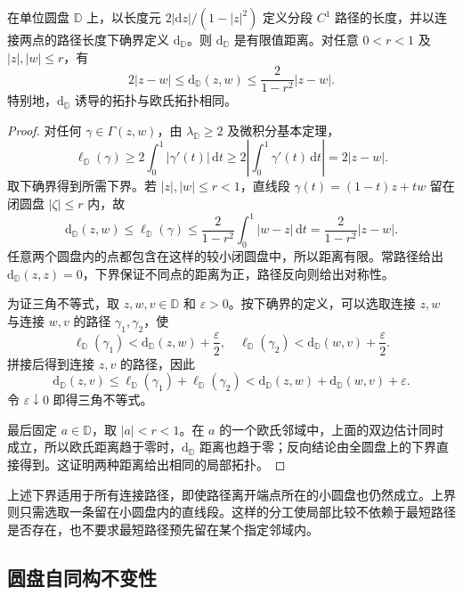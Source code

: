\begin{proposition}[路径距离与局部拓扑]\label{b3:prop:13-disk-path-metric}
在单位圆盘 \(\mathbb D\) 上，以长度元 \(2|\mathrm dz|/(1-|z|^2)\) 定义分段 \(C^1\) 路径的长度，并以连接两点的路径长度下确界定义 \(\mathrm d_{\mathbb D}\)。则 \(\mathrm d_{\mathbb D}\) 是有限值距离。对任意 \(0<r<1\) 及 \(|z|,|w|\le r\)，有
\[
 2|z-w|\le\mathrm d_{\mathbb D}(z,w)
 \le\frac{2}{1-r^2}|z-w|.
\]
特别地，\(\mathrm d_{\mathbb D}\) 诱导的拓扑与欧氏拓扑相同。
\end{proposition}
\begin{proof}
对任何 \(\gamma\in\Gamma(z,w)\)，由 \(\lambda_{\mathbb D}\ge2\) 及微积分基本定理，
\[
 \ell_{\mathbb D}(\gamma)
 \ge2\int_0^1|\gamma'(t)|\,\mathrm dt
 \ge2\left|\int_0^1\gamma'(t)\,\mathrm dt\right|
 =2|z-w|.
\]
取下确界得到所需下界。若 \(|z|,|w|\le r<1\)，直线段 \(\gamma(t)=(1-t)z+tw\) 留在闭圆盘 \(|\zeta|\le r\) 内，故
\[
 \mathrm d_{\mathbb D}(z,w)
 \le\ell_{\mathbb D}(\gamma)
 \le\frac{2}{1-r^2}\int_0^1|w-z|\,\mathrm dt
 =\frac{2}{1-r^2}|z-w|.
\]
任意两个圆盘内的点都包含在这样的较小闭圆盘中，所以距离有限。常路径给出 \(\mathrm d_{\mathbb D}(z,z)=0\)，下界保证不同点的距离为正，路径反向则给出对称性。

为证三角不等式，取 \(z,w,v\in\mathbb D\) 和 \(\varepsilon>0\)。按下确界的定义，可以选取连接 \(z,w\) 与连接 \(w,v\) 的路径 \(\gamma_1,\gamma_2\)，使
\[
 \ell_{\mathbb D}(\gamma_1)<\mathrm d_{\mathbb D}(z,w)+\frac\varepsilon2,
 \quad
 \ell_{\mathbb D}(\gamma_2)<\mathrm d_{\mathbb D}(w,v)+\frac\varepsilon2.
\]
拼接后得到连接 \(z,v\) 的路径，因此
\[
 \mathrm d_{\mathbb D}(z,v)
 \le\ell_{\mathbb D}(\gamma_1)+\ell_{\mathbb D}(\gamma_2)
 <\mathrm d_{\mathbb D}(z,w)+\mathrm d_{\mathbb D}(w,v)+\varepsilon.
\]
令 \(\varepsilon\downarrow0\) 即得三角不等式。

最后固定 \(a\in\mathbb D\)，取 \(|a|<r<1\)。在 \(a\) 的一个欧氏邻域中，上面的双边估计同时成立，所以欧氏距离趋于零时，\(\mathrm d_{\mathbb D}\) 距离也趋于零；反向结论由全圆盘上的下界直接得到。这证明两种距离给出相同的局部拓扑。
\end{proof}

上述下界适用于所有连接路径，即使路径离开端点所在的小圆盘也仍然成立。上界则只需选取一条留在小圆盘内的直线段。这样的分工使局部比较不依赖于最短路径是否存在，也不要求最短路径预先留在某个指定邻域内。

\subsection{圆盘自同构不变性}
\label{b3:subsec:130102}

